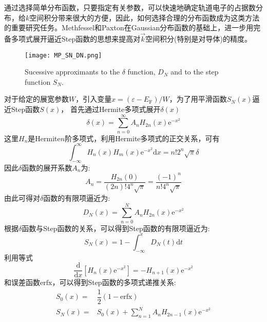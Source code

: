 通过选择简单分布函数，只要指定有关参数，可以快速地确定轨道电子的占据数分布，给$k$空间积分带来很大的方便，因此，如何选择合理的分布函数成为这类方法的重要研究任务。\textrm{Methfessel}和\textrm{Paxton}在\textrm{Gaussian}分布函数的基础上，进一步用完备多项式展开逼近\textrm{Step}函数的思想来提高对$\vec k$空间积分(特别是对导体)的精度。
\begin{figure}[t]
	\centering
	\vspace*{-0.5in}
	\texttt{[image: MP\_SN\_DN.png]}
	\caption{\textrm{Sucessive approximants to the $\delta$ function, $D_N$ and to the step function $S_N$.}}%
	\label{MP_SN_DN}
\end{figure}
对于给定的展宽参数$W$，引入变量$x=(\varepsilon-E_{\mathrm F})/W$，为了用平滑函数$S_N(x)$逼近\textrm{Step}函数$S(x)$，%
首先通过\textrm{Hermite}多项式展开$\delta(x)$
\begin{equation}
	\delta(x)=\sum_{n=0}^{\infty}A_nH_{2n}(x)\mathrm{e}^{-x^2}
	\label{eq:solid_kpoint-Gaussian-delta}
\end{equation}
这里$H_n$是\textrm{Hermite}$n$阶多项式，利用\textrm{Hermite}多项式的正交关系，可有
\begin{displaymath}
	\int_{-\infty}^{\infty}H_n(x)H_m(x)\mathrm{e}^{-x^2}\mathrm{d}x=n!2^n\sqrt{\pi}\delta
\end{displaymath}
因此$\delta$函数的展开系数$A_n$为:~
\begin{equation}
	A_n=\frac{H_{2n}(0)}{(2n)!4^n\sqrt{\pi}}=\frac{(-1)^n}{n!4^n\sqrt{\pi}}
	\label{eq:solid_kpoint-Gaussian-d-coeff}
\end{equation}
由此可得对$\delta$函数的有限项逼近为:~
\begin{displaymath}
	D_N(x)=\sum_{n=0}^NA_nH_{2n}(x)\mathrm{e}^{-x^2}
\end{displaymath}
根据$\delta$函数与\textrm{Step}函数的关系，可以得到\textrm{Step}函数的有限项逼近为:~
\begin{equation}
	S_N(x)=1-\int_{-\infty}^xD_N(t)\mathrm{d}t
	\label{eq:solid_kpoint-Gaussian-step}
\end{equation}
利用等式
\begin{displaymath}
	\dfrac{\mathrm{d}}{\mathrm{d}x}[H_n(x)\mathrm{e}^{-x^2}]=-H_{n+1}(x)\mathrm{e}^{-x^2}
\end{displaymath}
和误差函数$\mathrm{erfx}$，可以得到\textrm{Step}函数的多项式递推关系:
\begin{equation}
	\begin{aligned}
		S_0(x)=&\dfrac12(1-\mathrm{erfx})\\
		S_N(x)=&S_0(x)+\sum_{n=1}^NA_nH_{2n-1}(x)\mathrm{e}^{-x^2}
	\end{aligned}
	\label{eq:solid_kpoint-Gaussian-step2}
\end{equation}
